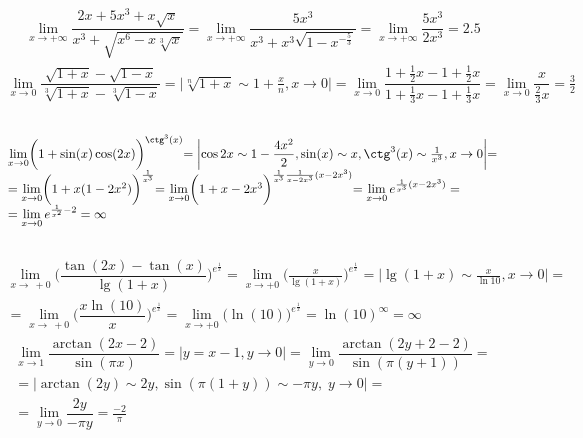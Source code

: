 \documentclass[12pt]{article}
\begin{document}
\\
$$
\begin{array}{l}
	\lim\limits_{x\rightarrow+\infty} \dfrac{2x + 5x^3 + x\sqrt{x}}{x^3 + \sqrt{x^6 - x\sqrt[3]{x}}}=\lim\limits_{x\rightarrow+\infty} \dfrac{5x^3}{x^3 + x^3\sqrt{1 - x^{-\frac{5}{3}}}}=\lim\limits_{x\rightarrow+\infty}\dfrac{5x^3}{2x^3}=2.5
\end{array}
$$
$$
\begin{array}{l} 
	\lim\limits_{x\rightarrow0} \dfrac{\sqrt{1 + x} - \sqrt{1-x}}{\sqrt[3]{1 + x} - \sqrt[3]{1 - x}} = \biggl| \sqrt[n]{1 + x} \sim 1 + \frac{x}{n}, x \to 0 \biggl| = \lim\limits_{x\rightarrow0}\dfrac{1 + \frac{1}{2}x - 1 + \frac{1}{2}x}{1 + \frac{1}{3}x - 1 + \frac{1}{3}x}=\lim\limits_{x\rightarrow0} \dfrac{x}{\frac{2}{3}x} = \frac{3}{2}
\end{array}
$$
\\
$$
\begin{array}{l}
	\lim\limits_{x\rightarrow0} \biggl(1 + \sin(x)\cos(2x)\biggl)^{\ctg^3(x)}=\biggl| \cos{2x} \sim 1-\dfrac{4x^2}{2}, \sin(x) \sim x, \ctg^3(x) \sim \frac{1}{x^3}, x \to 0 \biggl|= \\ =  \lim\limits_{x\rightarrow0}\biggl(1 + x(1 - 2x^2)\biggl)^{\frac{1}{x^3}} =\lim\limits_{x\rightarrow0} \biggl( 1 + x - 2x^3 \biggl)^{\frac{1}{x^3} \frac{1}{x - 2x^3} (x - 2x^3)} = \lim\limits_{x\rightarrow0} e^{\frac{1}{x^3} (x - 2x^3)}=\\=\lim\limits_{x\rightarrow0}e^{\frac{1}{x^2} - 2} = \infty
\end{array}
$$
\\
$$
\begin{array}{l}
\lim\limits_{x\rightarrow\ +0} \biggl(\dfrac{\tan(2x) - \tan(x)}{\lg(1 + x)}\biggl)^{e^{\frac{1}{x}}}=\lim\limits_{x\rightarrow +0} \biggl(\frac{x}{\lg(1 + x)}\biggl)^{e^\frac{1}{x}} = \biggl| \lg(1 + x) \sim \frac{x}{\ln{10}}, x \to 0 \biggl| =\\=\lim\limits_{x\rightarrow\ +0} \biggl( \dfrac{x \ln(10)}{x}\biggl)^{e^{\frac{1}{x}}} =\lim\limits_{x\rightarrow+0}\biggl( \ln(10) \biggl)^{e^{\frac{1}{x}}}=\ln(10)^{\infty}=\infty
\end{array}
$$
$$
\begin{array}{l}
\lim\limits_{x \rightarrow 1} \dfrac{\arctan(2x - 2)}{\sin(\pi x)}=\left| y=x - 1, y \to 0\right|= \lim\limits_{y\rightarrow0}\dfrac{\arctan(2y + 2 - 2)}{\sin(\pi (y + 1))}= \\ = \biggl| \arctan(2y) \sim 2y, \sin(\pi (1 + y)) \sim -\pi y,\; y \rightarrow 0\biggl|=\\=\lim\limits_{y\rightarrow0}\dfrac{2y}{-\pi y}= \frac{-2}{\pi}
\end{array} $$
\end{document}
